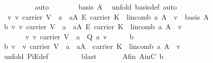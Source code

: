 \begin{isabellebody}
\ \ \ \ \ \ \ \ \isamarkupfalse%
\ auto\isanewline
\ \ \ \ \ \ \isamarkupfalse%
\ {\isachardoublequoteopen}{\isasymnot}basis\ A{\isachardoublequoteclose}\ \isamarkupfalse%
\ {\isacharparenleft}unfold\ basis{\isacharunderscore}def{\isacharcomma}\ auto{\isacharparenright}\isanewline
\ \ \ \ \isamarkupfalse%
\isanewline
\ \ \isamarkupfalse%
\isanewline
\ \ \isamarkupfalse%
\ {}{\isacharcolon}\ {\isachardoublequoteopen}{\isacharparenleft}{\isasymforall}v{\isachardot}\ v{\isasymin}\ carrier\ V\ {\isasymlongrightarrow}{\isacharparenleft}{\isasymexists}{\isacharbang}\ a{\isachardot}\ \ a{\isasymin}A\ {\isasymrightarrow}\isactrlsub E\ carrier\ K\ {\isasymand}\ lincomb\ a\ A\ {\isacharequal}\ v{\isacharparenright}{\isacharparenright}\ {\isasymLongrightarrow}\ basis\ A{\isachardoublequoteclose}\isanewline
\ \ \isamarkupfalse%
\ {\isacharminus}\isanewline
\ \ \ \ \isamarkupfalse%
\ b{}{\isacharcolon}\ {\isachardoublequoteopen}{\isacharparenleft}{\isasymforall}v{\isachardot}\ v{\isasymin}\ carrier\ V\ {\isasymlongrightarrow}{\isacharparenleft}{\isasymexists}{\isacharbang}\ a{\isachardot}\ \ a{\isasymin}A\ {\isasymrightarrow}\isactrlsub E\ carrier\ K\ {\isasymand}\ lincomb\ a\ A\ {\isacharequal}\ v{\isacharparenright}{\isacharparenright}{\isachardoublequoteclose}\ \isanewline
\ \ \ \ \ \ {\isacharparenleft}\ {\isachardoublequoteopen}{\isacharparenleft}{\isasymforall}v{\isachardot}\ v{\isasymin}\ carrier\ V\ {\isasymlongrightarrow}{\isacharparenleft}{\isasymexists}{\isacharbang}\ a{\isachardot}\ \ {\isacharquery}Q\ a\ v{\isacharparenright}{\isacharparenright}{\isachardoublequoteclose}{\isacharparenright}\isanewline
\ \ \ \ \isamarkupfalse%
\ b{}\ \isamarkupfalse%
\ b{}{\isacharcolon}\ {\isachardoublequoteopen}{\isacharparenleft}{\isasymforall}v{\isachardot}\ \ v{\isasymin}\ carrier\ V\ {\isasymlongrightarrow}{\isacharparenleft}{\isasymexists}\ a{\isachardot}\ \ a{\isasymin}A\ {\isasymrightarrow}\ carrier\ K\ {\isasymand}\ lincomb\ a\ A\ {\isacharequal}\ v{\isacharparenright}{\isacharparenright}{\isachardoublequoteclose}\ \isanewline
\ \ \ \ \ \ \isamarkupfalse%
\ {\isacharparenleft}unfold\ PiE{\isacharunderscore}def{\isacharparenright}\ \isanewline
\ \ \ \ \ \ \isamarkupfalse%
\ blast\ \isanewline
\ \ \ \ \isamarkupfalse%
\ A{\isacharunderscore}fin\ AinC\ b{}\ \isamarkupfalse%

\end{isabellebody}
